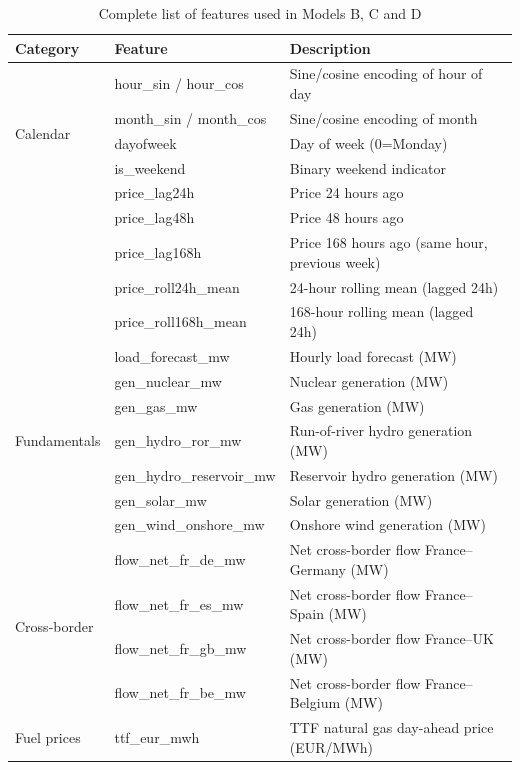 \documentclass[12pt, a4paper, oneside]{report}
\begin{document}
\begin{appendices}
\begin{table}[H]
\centering
\small
\caption{Complete list of features used in Models B, C and D}
\begin{tabularx}{\textwidth}{llX}
\toprule
\textbf{Category} & \textbf{Feature} & \textbf{Description} \\
\midrule
\multirow{5}{*}{Calendar}
  & hour\_sin / hour\_cos   & Sine/cosine encoding of hour of day \\
  & month\_sin / month\_cos & Sine/cosine encoding of month \\
  & dayofweek              & Day of week (0=Monday) \\
  & is\_weekend            & Binary weekend indicator \\
\midrule
\multirow{5}{*}{Price lags}
  & price\_lag24h          & Price 24 hours ago \\
  & price\_lag48h          & Price 48 hours ago \\
  & price\_lag168h         & Price 168 hours ago (same hour, previous week) \\
  & price\_roll24h\_mean   & 24-hour rolling mean (lagged 24h) \\
  & price\_roll168h\_mean  & 168-hour rolling mean (lagged 24h) \\
\midrule
\multirow{7}{*}{Fundamentals}
  & load\_forecast\_mw      & Hourly load forecast (MW) \\
  & gen\_nuclear\_mw        & Nuclear generation (MW) \\
  & gen\_gas\_mw            & Gas generation (MW) \\
  & gen\_hydro\_ror\_mw     & Run-of-river hydro generation (MW) \\
  & gen\_hydro\_reservoir\_mw & Reservoir hydro generation (MW) \\
  & gen\_solar\_mw          & Solar generation (MW) \\
  & gen\_wind\_onshore\_mw  & Onshore wind generation (MW) \\
\midrule
\multirow{4}{*}{Cross-border}
  & flow\_net\_fr\_de\_mw  & Net cross-border flow France--Germany (MW) \\
  & flow\_net\_fr\_es\_mw  & Net cross-border flow France--Spain (MW) \\
  & flow\_net\_fr\_gb\_mw  & Net cross-border flow France--UK (MW) \\
  & flow\_net\_fr\_be\_mw  & Net cross-border flow France--Belgium (MW) \\
\midrule
\multirow{2}{*}{Fuel prices}
  & ttf\_eur\_mwh          & TTF natural gas day-ahead price (EUR/MWh) \\

\end{tabularx}
\end{table}
\end{appendices}
\end{document}
